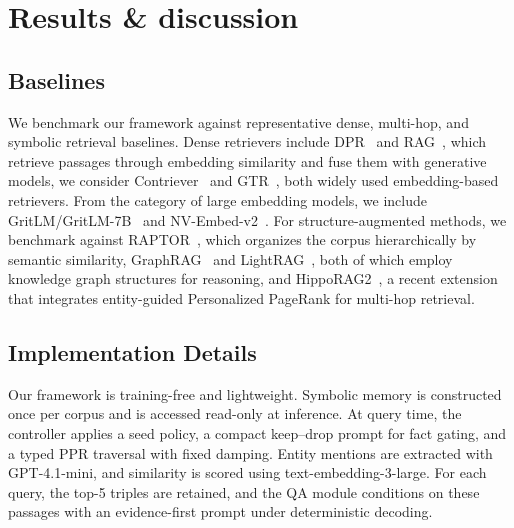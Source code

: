 \documentclass[runningheads]{llncs}
\begin{document}
\section{Results \& discussion}
\subsection{Baselines}
We benchmark our framework against representative dense, multi-hop, and symbolic retrieval baselines. Dense retrievers include DPR~\cite{karpukhin2020dense} and RAG~\cite{lewis2020retrieval}, which retrieve passages through embedding similarity and fuse them with generative models, we consider Contriever~\cite{izacard2021unsupervised} and GTR~\cite{muennighoff2024generative}, both widely used embedding-based retrievers. From the category of large embedding models, we include GritLM/GritLM-7B~\cite{ni2021large} and NV-Embed-v2~\cite{lee2024nv}. For structure-augmented methods, we benchmark against RAPTOR~\cite{sarthi2024raptor}, which organizes the corpus hierarchically by semantic similarity, GraphRAG~\cite{edge2024local} and LightRAG~\cite{guo2024lightrag}, both of which employ knowledge graph structures for reasoning, and HippoRAG2~\cite{gutierrez2025rag}, a recent extension that integrates entity-guided Personalized PageRank for multi-hop retrieval.

\subsection{Implementation Details}
\noindent
Our framework is training-free and lightweight. Symbolic memory is constructed once per corpus and is accessed read-only at inference. At query time, the controller applies a seed policy, a compact keep–drop prompt for fact gating, and a typed PPR traversal with fixed damping. Entity mentions are extracted with GPT-4.1-mini, and similarity is scored using text-embedding-3-large. For each query, the top-5 triples are retained, and the QA module conditions on these passages with an evidence-first prompt under deterministic decoding.
\end{document}
